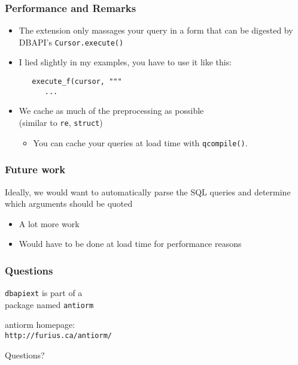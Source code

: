 \documentclass{beamer}
\begin{document}
\begin{frame}[fragile]
  \frametitle{Performance and Remarks}

  \begin{itemize}
  \item The extension only massages your query in a form that can be digested by
    DBAPI's \texttt{Cursor.execute()}

  \item I lied slightly in my examples, you have to use it like this:
\begin{verbatim}
   execute_f(cursor, """
      ...
\end{verbatim}

  \item We cache as much of the preprocessing as possible \\
(similar to \texttt{re}, \texttt{struct})
    \begin{itemize}
    \item You can cache your queries at load time with \texttt{qcompile()}.
    \end{itemize}
  \end{itemize}


\end{frame}



\begin{frame}[fragile]
  \frametitle{Future work}

Ideally, we would want to automatically parse the SQL queries and
determine which arguments should be quoted 

  \begin{itemize}
  \item A lot more work
  \item Would have to be done at load time for performance reasons
  \end{itemize}
  

\end{frame}



\begin{frame}[fragile]
  \frametitle{Questions}

  \begin{center}


{\Large
\texttt{dbapiext} is part of a \\
package named \texttt{antiorm}
}

\vfill

{\LARGE
antiorm homepage: \\
\verb=http://furius.ca/antiorm/=
}

\vfill

{\LARGE Questions?}

  \end{center}

\end{frame}


\end{document}

